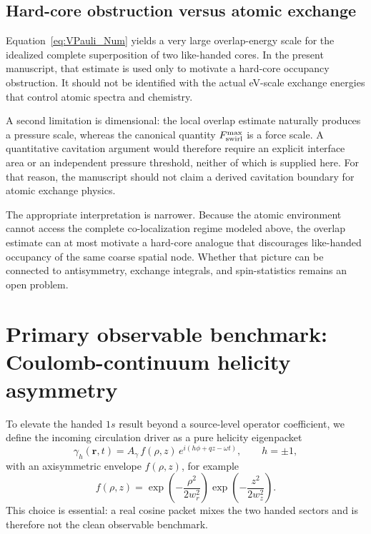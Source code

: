 \documentclass[11pt,a4paper]{article}
\begin{document}
    \subsection{Hard-core obstruction versus atomic exchange}
        Equation~\eqref{eq:VPauli_Num} yields a very large overlap-energy scale for the idealized complete superposition of two like-handed cores. In the present manuscript, that estimate is used only to motivate a hard-core occupancy obstruction. It should not be identified with the actual eV-scale exchange energies that control atomic spectra and chemistry.
        
        A second limitation is dimensional: the local overlap estimate naturally produces a pressure scale, whereas the canonical quantity $F_{\rm swirl}^{\max}$ is a force scale. A quantitative cavitation argument would therefore require an explicit interface area or an independent pressure threshold, neither of which is supplied here. For that reason, the manuscript should not claim a derived cavitation boundary for atomic exchange physics.
        
        The appropriate interpretation is narrower. Because the atomic environment cannot access the complete co-localization regime modeled above, the overlap estimate can at most motivate a hard-core analogue that discourages like-handed occupancy of the same coarse spatial node. Whether that picture can be connected to antisymmetry, exchange integrals, and spin-statistics remains an open problem.
        
        
   
    \section{Primary observable benchmark: Coulomb-continuum helicity asymmetry}
        
        To elevate the handed $1s$ result beyond a source-level operator coefficient, we define the incoming circulation driver as a pure helicity eigenpacket
        \begin{equation}
            \gamma_h(\mathbf r,t)
            =
            A_\gamma\,f(\rho,z)\,e^{i(h\phi+qz-\omega t)},
            \qquad
            h=\pm 1,
        \end{equation}
        with an axisymmetric envelope $f(\rho,z)$, for example
        \begin{equation}
            f(\rho,z)
            =
            \exp\!\left(-\frac{\rho^2}{2w_r^2}\right)
            \exp\!\left(-\frac{z^2}{2w_z^2}\right).
        \end{equation}
        This choice is essential: a real cosine packet mixes the two handed sectors and is therefore not the clean observable benchmark.
        
\end{document}
